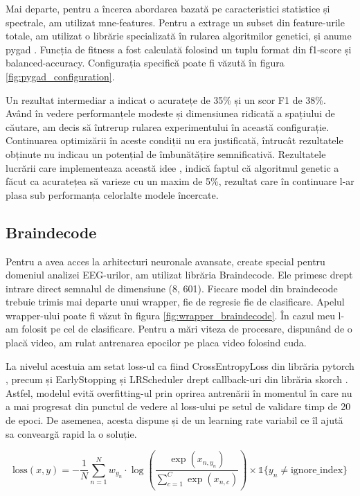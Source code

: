 Mai departe, pentru a încerca abordarea bazată pe caracteristici statistice și spectrale, am utilizat mne-features\cite{mne-features}. Pentru a extrage un subset din feature-urile totale, am utilizat o librărie specializată în rularea algoritmilor genetici, și anume pygad \cite{pygad}. Funcția de fitness a fost calculată folosind un tuplu format din f1-score și balanced-accuracy. Configurația specifică poate fi văzută în figura \ref{fig:pygad_configuration}. 

Un rezultat intermediar a indicat o acuratețe de 35\% și un scor F1 de 38\%. Având în vedere performanțele modeste și dimensiunea ridicată a spațiului de căutare, am decis să întrerup rularea experimentului în această configurație. Continuarea optimizării în aceste condiții nu era justificată, întrucât rezultatele obținute nu indicau un potențial de îmbunătățire semnificativă. Rezultatele lucrării care implementeaza această idee \cite{ATKINSON201635}, indică faptul că algoritmul genetic a făcut ca acuratețea să varieze cu un maxim de 5\%, rezultat care în continuare l-ar plasa sub performanța celorlalte modele încercate. 

\subsection{Braindecode}
Pentru a avea acces la arhitecturi neuronale avansate, create special pentru domeniul analizei EEG-urilor, am utilizat librăria Braindecode\cite{braindecode}. Ele primesc drept intrare direct semnalul de dimensiune (8, 601). Fiecare model din braindecode trebuie trimis mai departe unui wrapper, fie de regresie fie de clasificare. Apelul wrapper-ului poate fi văzut în figura \ref{fig:wrapper_braindecode}. În cazul meu l-am folosit pe cel de clasificare. Pentru a mări viteza de procesare, dispunând de o placă video, am rulat antrenarea epocilor pe placa video folosind cuda.

La nivelul acestuia am setat loss-ul ca fiind CrossEntropyLoss din librăria pytorch \cite{pytorch}, precum și EarlyStopping și LRScheduler drept callback-uri din librăria skorch \cite{skorch}. Astfel, modelul evită overfitting-ul prin oprirea antrenării în momentul în care nu a mai progresat din punctul de vedere al loss-ului pe setul de validare timp de 20 de epoci. De asemenea, acesta dispune și de un learning rate variabil ce îl ajută sa conveargă rapid la o soluție. 

\begin{equation}
    \text{loss}(x, y) = -\frac{1}{N} \sum_{n=1}^{N} w_{y_n} \cdot \log\left(\frac{\exp(x_{n,y_n})}{\sum_{c=1}^{C} \exp(x_{n,c})}\right) \times \mathbb{1}\{y_n \neq \text{ignore\_index}\}
\end{equation}

